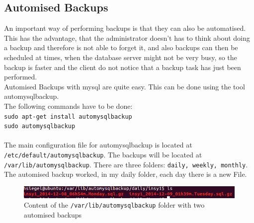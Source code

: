 \documentclass[10pt]{article}
\begin{document}
\subsection{Automised Backups}
An important way of performing backups is that they can also be automatised. This has the advantage, that the administrator doesn't has to think about doing a backup and therefore is not able to forget it, and also backups can then be scheduled at times, when the database server might not be very busy, so the backup is faster and the client do not notice that a backup task has just been performed.  \\
Automised Backups with mysql are quite easy. This can be done using the tool automysqlbackup. \\
The following commands have to be done: \\
\texttt{sudo apt-get install automysqlbackup} \\
\texttt{sudo automysqlbackup} \\ \\
The main configuration file for automysqlbackup is located at \texttt{/etc/default/automysqlbackup}.
The backups will be located at \texttt{/var/lib/automysqlbackup}. There are three folders: \texttt{daily, weekly, monthly}.
The automised backup worked, in my daily folder, each day there is a new File.
\begin{figure}[!h]
	\begin{center}
		\includegraphics[width=1.0\linewidth]{pictures/mysql_autobackup}
		\caption{Content of the \texttt{/var/lib/automysqlbackup} folder with two automised backups}
		\label{content}
	\end{center}
\end{figure}



\end{document}
